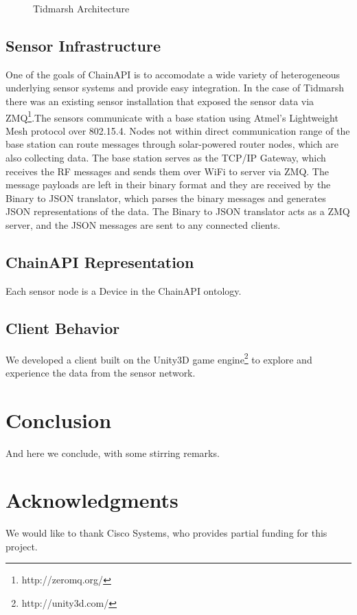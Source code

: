 \documentclass{acm_proc_article-sp}
\begin{document}
\begin{figure}
    \centering
    
    \caption{Tidmarsh Architecture}
    \label{tidmarsh_arch}
\end{figure}

\subsection{Sensor Infrastructure}

One of the goals of ChainAPI is to accomodate a wide variety of heterogeneous
underlying sensor systems and provide easy integration. In the case of Tidmarsh
there was an existing sensor installation that exposed the sensor data via
ZMQ\footnote{http://zeromq.org/}.The sensors communicate with a base station
using Atmel's Lightweight Mesh protocol over 802.15.4. Nodes not within direct
communication range of the base station can route messages through
solar-powered router nodes, which are also collecting data. The base station
serves as the TCP/IP Gateway, which receives the RF messages and sends them
over WiFi to  server via ZMQ. The message payloads are left in their binary
format and they are received by the Binary to JSON translator, which parses the
binary messages and generates JSON representations of the data. The Binary to
JSON translator acts as a ZMQ server, and the JSON messages are sent to any
connected clients.

\subsection{ChainAPI Representation}

Each sensor node is a Device in the ChainAPI ontology.

\subsection{Client Behavior}

We developed a client built on the Unity3D game
engine\footnote{http://unity3d.com/} to explore and experience the data from
the sensor network.

\section{Conclusion}
And here we conclude, with some stirring remarks.

\section{Acknowledgments}
We would like to thank Cisco Systems, who provides partial funding for this
project.


%
%
\end{document}
